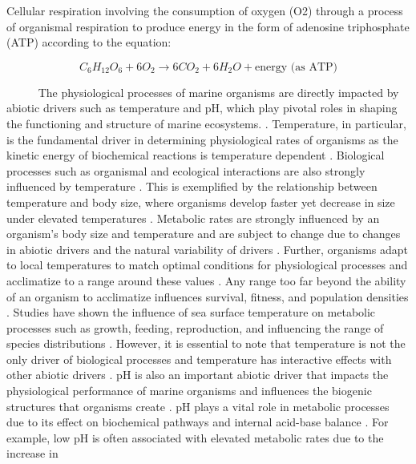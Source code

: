 \documentclass[
  12pt,
]{article}
\begin{document}
Cellular respiration involving the consumption of oxygen (O2) through a
process of organismal respiration to produce energy in the form of
adenosine triphosphate (ATP) \cite{babcock1992oxygen} according to the
equation:

\[
C_6H_{12}O_6 + 6O_2 \rightarrow 6CO_2 + 6H_2O + \text{energy (as ATP)}
\]

~~~~~ The physiological processes of marine organisms are directly
impacted by abiotic drivers such as temperature and pH, which play
pivotal roles in shaping the functioning and structure of marine
ecosystems. \citep{woodwell1970effects}. Temperature, in particular, is
the fundamental driver in determining physiological rates of organisms
as the kinetic energy of biochemical reactions is temperature dependent
\citep{levins1968evolution, somero2002thermal, portner2012integrating}.
Biological processes such as organismal and ecological interactions are
also strongly influenced by temperature
\citep{hochachka2002biochemical}. This is exemplified by the
relationship between temperature and body size, where organisms develop
faster yet decrease in size under elevated temperatures
\citep{elahi2020historical}. Metabolic rates are strongly influenced by
an organism's body size and temperature and are subject to change due to
changes in abiotic drivers and the natural variability of drivers
\citep{brown2004metabolic, oconnor2007temperature}. Further, organisms
adapt to local temperatures to match optimal conditions for
physiological processes and acclimatize to a range around these values
\citep{sinclair2016can}. Any range too far beyond the ability of an
organism to acclimatize influences survival, fitness, and population
densities \citep{hochachka2002biochemical}. Studies have shown the
influence of sea surface temperature on metabolic processes such as
growth, feeding, reproduction, and influencing the range of species
distributions
\citep{kordas2011community, sanford2002feeding, pinsky2013marine}.
However, it is essential to note that temperature is not the only driver
of biological processes and temperature has interactive effects with
other abiotic drivers \citep{darling2008quantifying}. pH is also an
important abiotic driver that impacts the physiological performance of
marine organisms and influences the biogenic structures that organisms
create \citep{hofmann2010living}. pH plays a vital role in metabolic
processes due to its effect on biochemical pathways and internal
acid-base balance \citep{gaylord2015ocean}. For example, low pH is often
associated with elevated metabolic rates due to the increase in
\end{document}
